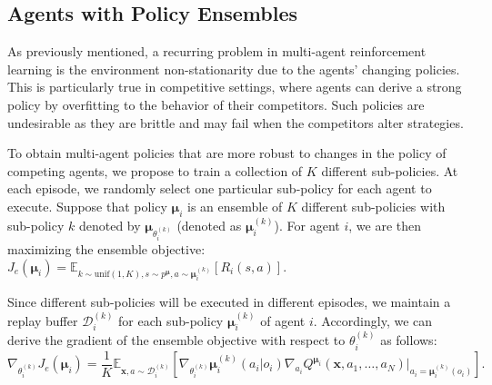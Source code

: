 \documentclass{article}
\newcommand{\comment}[1]{\textbf{\textcolor{red}{comment: #1}}}
\newcommand{\cpol}[0]{\pmb{\mu}}
\begin{document}
\subsection{Agents with Policy Ensembles}
\label{sec:ensemble}
As previously mentioned, a recurring problem in multi-agent reinforcement learning is the environment non-stationarity due to the agents' changing policies. This is particularly true in competitive settings, where agents can derive a strong policy by overfitting to the behavior of their competitors. Such policies are undesirable as they are brittle and may fail when the competitors alter strategies.


To obtain multi-agent policies that are more robust to changes in the policy of competing agents, we propose to train a collection of $K$ different sub-policies. At each episode, we randomly select one particular sub-policy for each agent to execute. 
Suppose that policy $\cpol_i$ is an ensemble of $K$ different sub-policies with sub-policy $k$ denoted by $\cpol_{\theta_i^{(k)}}$ (denoted as $\cpol_i^{(k)}$). For agent $i$, we are then maximizing the ensemble objective:
$
J_e(\cpol_i)=\mathbb{E}_{k\sim\textrm{unif}(1,K),s\sim p^{\cpol},a\sim\cpol_i^{(k)}}\left[R_i(s,a)\right].
$

Since different sub-policies will be executed in different episodes, we maintain a replay buffer $\mathcal{D}_i^{(k)}$ for each sub-policy $\cpol_i^{(k)}$ of agent $i$. Accordingly, we can derive the gradient of the ensemble objective with respect to $\theta_i^{(k)}$ as follows:
\begin{equation}\label{eq:J_ensemble_grad}
\nabla_{\theta_i^{(k)}} J_e(\cpol_i)=\frac{1}{K}\mathbb{E}_{\mathbf{x},a\sim \mathcal{D}_i^{(k)}}\left[\nabla_{\theta_i^{(k)}} \cpol_i^{(k)}(a_i|o_i)\nabla_{a_i}Q^{\cpol_i}\left(\mathbf{x},a_1,\ldots,a_N\right)\Big|_{a_i=\cpol_i^{(k)}(o_i)}\right].
\end{equation}
\end{document}
